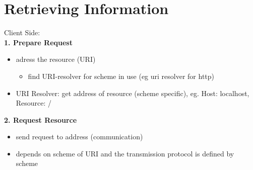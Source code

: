 \documentclass[11pt]{article}
\begin{document}
\section{Retrieving Information}
\label{sec:org139f00b}
Client Side:\\
\textbf{1. Prepare Request}
\begin{itemize}
\item adress the resource (URI)
\begin{itemize}
\item find URI-resolver for scheme in use (eg uri resolver for http)
\end{itemize}
\item URI Resolver: get address of resource (scheme specific), eg. Host: localhost, Resource: /\\
\end{itemize}
\textbf{2. Request Resource}
\begin{itemize}
\item send request to address (communication)
\item depends on scheme of URI and the transmission protocol is defined by scheme
\end{itemize}
\end{document}
